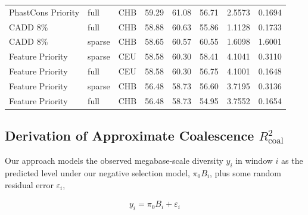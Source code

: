 \documentclass[11pt]{article}
\begin{document}
\begin{table}
\begin{tabular}{lll|crr|cc}
PhastCons Priority &              full &          CHB &                        59.29 &             61.08 &            56.71 &                                 2.5573 &                                0.1694 \\
          CADD 8\% &              full &          CHB &                        58.88 &             60.63 &            55.86 &                                 1.1128 &                                0.1733 \\
          CADD 8\% &            sparse &          CHB &                        58.65 &             60.57 &            60.55 &                                 1.6098 &                                1.6001 \\
  Feature Priority &            sparse &          CEU &                        58.58 &             60.30 &            58.41 &                                 4.1041 &                                0.3110 \\
  Feature Priority &              full &          CEU &                        58.58 &             60.30 &            56.75 &                                 4.1001 &                                0.1648 \\
  Feature Priority &            sparse &          CHB &                        56.48 &             58.73 &            56.60 &                                 3.7195 &                                0.3136 \\
  Feature Priority &              full &          CHB &                        56.48 &             58.73 &            54.95 &                                 3.7552 &                                0.1654 \\
\hline
\end{tabular}
\end{table}


\subsection{Derivation of Approximate Coalescence $R_\text{coal}^2$}
\label{supp:r2-coal}

Our approach models the observed megabase-scale diversity $y_i$ in window $i$
as the predicted level under our negative selection model, $\pi_0 B_i$, plus
some random residual error $\varepsilon_i$,

\begin{align}
    y_i = \pi_0 B_i + \varepsilon_i
\end{align}
\end{document}
